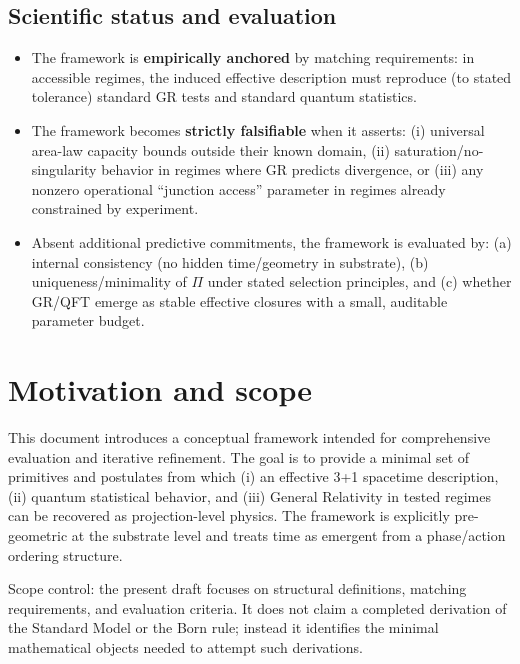 \documentclass[reprint, amsmath, amssymb, aps, prd]{revtex4-2}
\begin{document}
\subsection{Scientific status and evaluation}
\begin{itemize}
    \item The framework is \textbf{empirically anchored} by matching requirements: in accessible regimes, the induced effective description must reproduce (to stated tolerance) standard GR tests and standard quantum statistics.
    \item The framework becomes \textbf{strictly falsifiable} when it asserts: (i) universal area-law capacity bounds outside their known domain, (ii) saturation/no-singularity behavior in regimes where GR predicts divergence, or (iii) any nonzero operational ``junction access'' parameter in regimes already constrained by experiment.
    \item Absent additional predictive commitments, the framework is evaluated by: (a) internal consistency (no hidden time/geometry in substrate), (b) uniqueness/minimality of $\Pi$ under stated selection principles, and (c) whether GR/QFT emerge as stable effective closures with a small, auditable parameter budget.
\end{itemize}

\section{Motivation and scope}
This document introduces a conceptual framework intended for comprehensive evaluation and iterative refinement. The goal is to provide a minimal set of primitives and postulates from which (i) an effective 3+1 spacetime description, (ii) quantum statistical behavior, and (iii) General Relativity in tested regimes can be recovered as projection-level physics. The framework is explicitly pre-geometric at the substrate level and treats time as emergent from a phase/action ordering structure.

Scope control: the present draft focuses on structural definitions, matching requirements, and evaluation criteria. It does not claim a completed derivation of the Standard Model or the Born rule; instead it identifies the minimal mathematical objects needed to attempt such derivations.

\end{document}
